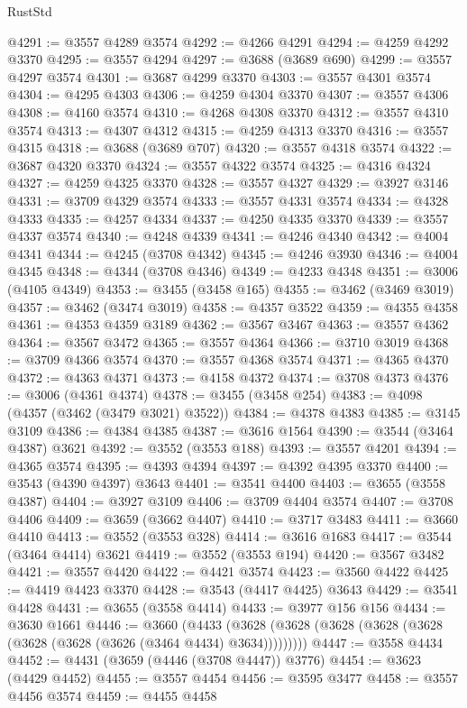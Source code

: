 \begin{lexlean}{RustStd}
\begin{coremodule}
@4291 := @3557 @4289 @3574
@4292 := @4266 @4291
@4294 := @4259 @4292 @3370
@4295 := @3557 @4294
@4297 := @3688 (@3689 @690)
@4299 := @3557 @4297 @3574
@4301 := @3687 @4299 @3370
@4303 := @3557 @4301 @3574
@4304 := @4295 @4303
@4306 := @4259 @4304 @3370
@4307 := @3557 @4306
@4308 := @4160 @3574
@4310 := @4268 @4308 @3370
@4312 := @3557 @4310 @3574
@4313 := @4307 @4312
@4315 := @4259 @4313 @3370
@4316 := @3557 @4315
@4318 := @3688 (@3689 @707)
@4320 := @3557 @4318 @3574
@4322 := @3687 @4320 @3370
@4324 := @3557 @4322 @3574
@4325 := @4316 @4324
@4327 := @4259 @4325 @3370
@4328 := @3557 @4327
@4329 := @3927 @3146
@4331 := @3709 @4329 @3574
@4333 := @3557 @4331 @3574
@4334 := @4328 @4333
@4335 := @4257 @4334
@4337 := @4250 @4335 @3370
@4339 := @3557 @4337 @3574
@4340 := @4248 @4339
@4341 := @4246 @4340
@4342 := @4004 @4341
@4344 := @4245 (@3708 @4342)
@4345 := @4246 @3930
@4346 := @4004 @4345
@4348 := @4344 (@3708 @4346)
@4349 := @4233 @4348
@4351 := @3006 (@4105 @4349)
@4353 := @3455 (@3458 @165)
@4355 := @3462 (@3469 @3019)
@4357 := @3462 (@3474 @3019)
@4358 := @4357 @3522
@4359 := @4355 @4358
@4361 := @4353 @4359 @3189
@4362 := @3567 @3467
@4363 := @3557 @4362
@4364 := @3567 @3472
@4365 := @3557 @4364
@4366 := @3710 @3019
@4368 := @3709 @4366 @3574
@4370 := @3557 @4368 @3574
@4371 := @4365 @4370
@4372 := @4363 @4371
@4373 := @4158 @4372
@4374 := @3708 @4373
@4376 := @3006 (@4361 @4374)
@4378 := @3455 (@3458 @254)
@4383 := @4098 (@4357 (@3462 (@3479 @3021) @3522))
@4384 := @4378 @4383
@4385 := @3145 @3109
@4386 := @4384 @4385
@4387 := @3616 @1564
@4390 := @3544 (@3464 @4387) @3621
@4392 := @3552 (@3553 @188)
@4393 := @3557 @4201
@4394 := @4365 @3574
@4395 := @4393 @4394
@4397 := @4392 @4395 @3370
@4400 := @3543 (@4390 @4397) @3643
@4401 := @3541 @4400
@4403 := @3655 (@3558 @4387)
@4404 := @3927 @3109
@4406 := @3709 @4404 @3574
@4407 := @3708 @4406
@4409 := @3659 (@3662 @4407)
@4410 := @3717 @3483
@4411 := @3660 @4410
@4413 := @3552 (@3553 @328)
@4414 := @3616 @1683
@4417 := @3544 (@3464 @4414) @3621
@4419 := @3552 (@3553 @194)
@4420 := @3567 @3482
@4421 := @3557 @4420
@4422 := @4421 @3574
@4423 := @3560 @4422
@4425 := @4419 @4423 @3370
@4428 := @3543 (@4417 @4425) @3643
@4429 := @3541 @4428
@4431 := @3655 (@3558 @4414)
@4433 := @3977 @156 @156
@4434 := @3630 @1661
@4446 := @3660
    (@4433 (@3628 (@3628 (@3628 (@3628 (@3628 (@3628 (@3628 (@3626 (@3464 @4434) @3634)))))))))
@4447 := @3558 @4434
@4452 := @4431 (@3659 (@4446 (@3708 @4447)) @3776)
@4454 := @3623 (@4429 @4452)
@4455 := @3557 @4454
@4456 := @3595 @3477
@4458 := @3557 @4456 @3574
@4459 := @4455 @4458

\end{coremodule}
\end{lexlean}
